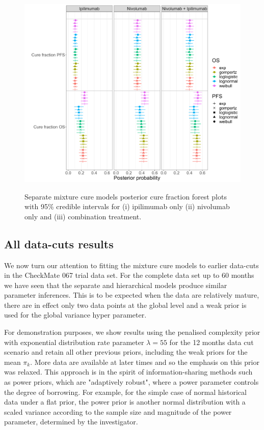 \documentclass[AMA,STIX1COL]{WileyNJD-v2}
\begin{document}
\begin{figure}[hbt!]
\centering
\includegraphics[height=10cm, width=0.9\linewidth]{forest_plot_sep_multimcm.png}
\caption{\label{fig:cf_forest_all_tx_sep} Separate mixture cure models posterior cure fraction forest plots with 95\% credible intervals for (i) ipilimumab only (ii) nivolumab only and (iii) combination treatment.}
\end{figure}

%
\subsection{All data-cuts results}\label{sec:results-data-cut}
We now turn our attention to fitting the mixture cure models to earlier data-cuts in the CheckMate 067 trial data set.
For the complete data set up to 60 months we have seen that the separate and hierarchical models produce similar parameter inferences. This is to be expected when the data are relatively mature, there are in effect only two data points at the global level and a weak prior is used for the global variance hyper parameter.

For demonstration purposes, we show results using the penalised complexity prior with exponential distribution rate parameter $\lambda = 55$ for the 12 months data cut scenario and retain all other previous priors, including the weak priors for the mean $\pi_k$. More data are available at later times and so the emphasis on this prior was relaxed. This approach is in the spirit of information-sharing methods such as power priors, which are "adaptively robust", where a power parameter controls the degree of borrowing. For example, for the simple case of normal historical data under a flat prior, the power prior is another normal distribution with a scaled variance according to the sample size and magnitude of the power parameter, determined by the investigator.
\end{document}
